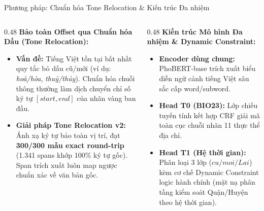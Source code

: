 \documentclass[aspectratio=169, 9pt]{beamer}
\begin{document}
\begin{frame}{Phương pháp: Chuẩn hóa Tone Relocation \& Kiến trúc Đa nhiệm}
  \vspace{-0.15cm}
  \begin{columns}[T]
    \begin{column}{0.48\textwidth}
      \textbf{Bảo toàn Offset qua Chuẩn hóa Dấu (Tone Relocation):}
      \begin{itemize}
        \setlength{\itemsep}{2.5pt}
        \item \textbf{Vấn đề:} Tiếng Việt tồn tại bất nhất quy tắc bỏ dấu cũ/mới (ví dụ: \textit{hoà/hòa}, \textit{thuỷ/thủy}). Chuẩn hóa chuỗi thông thường làm dịch chuyển chỉ số ký tự $[start, end]$ của nhãn vàng ban đầu.
        \item \textbf{Giải pháp Tone Relocation v2:} Ánh xạ ký tự bảo toàn vị trí, đạt \textbf{300/300 mẫu exact round-trip} (1.341 spans khớp 100\% ký tự gốc). Span trích xuất luôn map ngược chuẩn xác về văn bản gốc.
      \end{itemize}
    \end{column}
    \begin{column}{0.48\textwidth}
      \textbf{Kiến trúc Mô hình Đa nhiệm \& Dynamic Constraint:}
      \begin{itemize}
        \setlength{\itemsep}{2.5pt}
        \item \textbf{Encoder dùng chung:} PhoBERT-base trích xuất biểu diễn ngữ cảnh tiếng Việt sâu sắc cấp word/subword.
        \item \textbf{Head T0 (BIO23):} Lớp chiếu tuyến tính kết hợp CRF giải mã toàn cục chuỗi nhãn 11 thực thể địa chỉ.
        \item \textbf{Head T1 (Hệ thời gian):} Phân loại 3 lớp ($cu/moi/Lai$) kèm cơ chế Dynamic Constraint logic hành chính (mặt nạ phân tầng kiểm soát Quận/Huyện theo hệ thời gian).
      \end{itemize}
    \end{column}
  \end{columns}
\end{frame}
\end{document}
